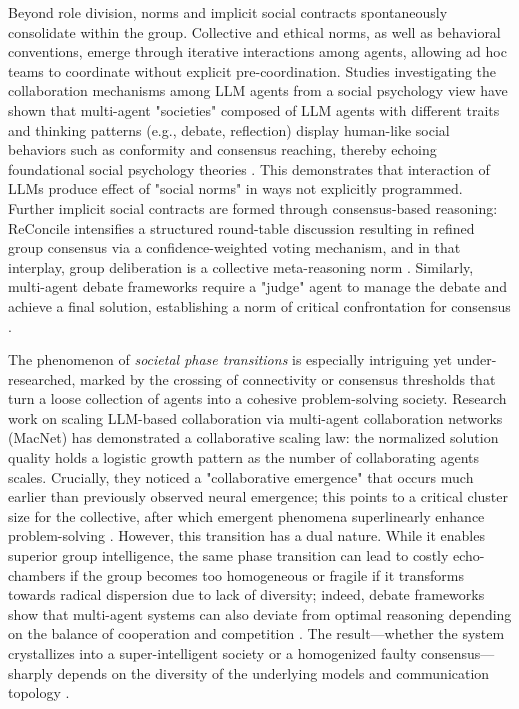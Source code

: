 \documentclass[11pt,a4paper]{article}
\begin{document}
Beyond role division, norms and implicit social contracts spontaneously consolidate within the group. Collective and ethical norms, as well as behavioral conventions, emerge through iterative interactions among agents, allowing ad hoc teams to coordinate without explicit pre-coordination. Studies investigating the collaboration mechanisms among LLM agents from a social psychology view have shown that multi-agent "societies" composed of LLM agents with different traits and thinking patterns (e.g., debate, reflection) display human-like social behaviors such as conformity and consensus reaching, thereby echoing foundational social psychology theories \cite{arxiv:2310.02124v2,arxiv:2310.06500v1}. This demonstrates that interaction of LLMs produce effect of "social norms" in ways not explicitly programmed. Further implicit social contracts are formed through consensus-based reasoning: ReConcile intensifies a structured round-table discussion resulting in refined group consensus via a confidence-weighted voting mechanism, and in that interplay, group deliberation is a collective meta-reasoning norm \cite{arxiv:2309.13007v2}. Similarly, multi-agent debate frameworks require a "judge" agent to manage the debate and achieve a final solution, establishing a norm of critical confrontation for consensus \cite{arxiv:2305.19118v1}.

The phenomenon of \emph{societal phase transitions} is especially intriguing yet under-researched, marked by the crossing of connectivity or consensus thresholds that turn a loose collection of agents into a cohesive problem-solving society. Research work on scaling LLM-based collaboration via multi-agent collaboration networks (MacNet) has demonstrated a collaborative scaling law: the normalized solution quality holds a logistic growth pattern as the number of collaborating agents scales. Crucially, they noticed a "collaborative emergence" that occurs much earlier than previously observed neural emergence; this points to a critical cluster size for the collective, after which emergent phenomena superlinearly enhance problem-solving \cite{arxiv:2406.07155v1}. However, this transition has a dual nature. While it enables superior group intelligence, the same phase transition can lead to costly echo-chambers if the group becomes too homogeneous or fragile if it transforms towards radical dispersion due to lack of diversity; indeed, debate frameworks show that multi-agent systems can also deviate from optimal reasoning depending on the balance of cooperation and competition \cite{arxiv:2305.19118v1,arxiv:2310.02124v2}. The result---whether the system crystallizes into a super-intelligent society or a homogenized faulty consensus---sharply depends on the diversity of the underlying models and communication topology \cite{arxiv:2309.13007v2,arxiv:2406.07155v1}.
\end{document}
